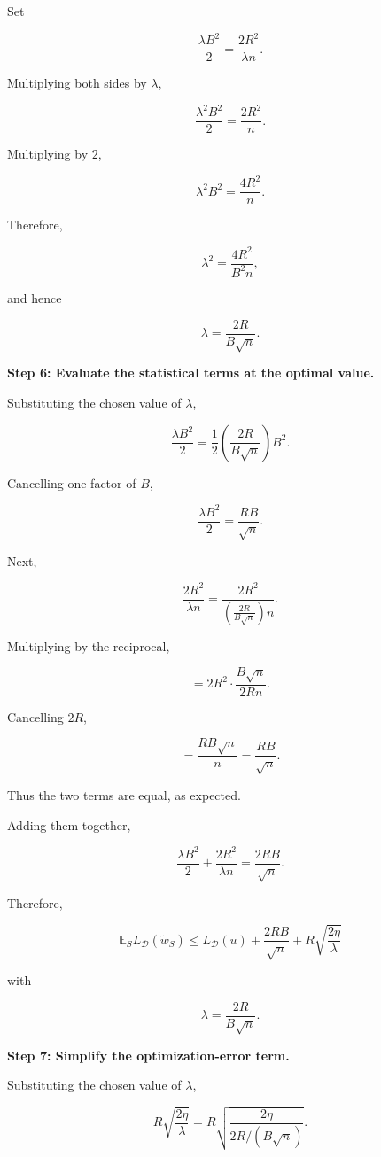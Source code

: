 \documentclass[11pt]{article}
\newcommand{\E}{\mathbb{E}}
\begin{document}
\begin{enumerate}
\begin{solutionbox}
Set

\[
\frac{\lambda B^2}{2}
=
\frac{2R^2}{\lambda n}.
\]

Multiplying both sides by \(\lambda\),

\[
\frac{\lambda^2 B^2}{2}
=
\frac{2R^2}{n}.
\]

Multiplying by \(2\),

\[
\lambda^2 B^2
=
\frac{4R^2}{n}.
\]

Therefore,

\[
\lambda^2
=
\frac{4R^2}{B^2 n},
\]

and hence

\[
\boxed{
\lambda
=
\frac{2R}{B\sqrt n}.
}
\]

\medskip

\textbf{Step 6: Evaluate the statistical terms at the optimal value.}

Substituting the chosen value of \(\lambda\),

\[
\frac{\lambda B^2}{2}
=
\frac12
\left(
\frac{2R}{B\sqrt n}
\right)
B^2.
\]

Cancelling one factor of \(B\),

\[
\frac{\lambda B^2}{2}
=
\frac{RB}{\sqrt n}.
\]

Next,

\[
\frac{2R^2}{\lambda n}
=
\frac{2R^2}
{\left(\frac{2R}{B\sqrt n}\right)n}.
\]

Multiplying by the reciprocal,

\[
=
2R^2
\cdot
\frac{B\sqrt n}{2Rn}.
\]

Cancelling \(2R\),

\[
=
\frac{RB\sqrt n}{n}
=
\frac{RB}{\sqrt n}.
\]

Thus the two terms are equal, as expected.

Adding them together,

\[
\frac{\lambda B^2}{2}
+
\frac{2R^2}{\lambda n}
=
\frac{2RB}{\sqrt n}.
\]

Therefore,

\[
\boxed{
\E_S L_{\mathcal D}(\widetilde w_S)
\le
L_{\mathcal D}(u)
+
\frac{2RB}{\sqrt n}
+
R\sqrt{\frac{2\eta}{\lambda}}
}
\]

with

\[
\boxed{
\lambda
=
\frac{2R}{B\sqrt n}.
}
\]

\medskip

\textbf{Step 7: Simplify the optimization-error term.}

Substituting the chosen value of \(\lambda\),

\[
R\sqrt{\frac{2\eta}{\lambda}}
=
R
\sqrt{
\frac{2\eta}
     {2R/(B\sqrt n)}
}.
\]


\end{solutionbox}
\end{enumerate}
\end{document}

